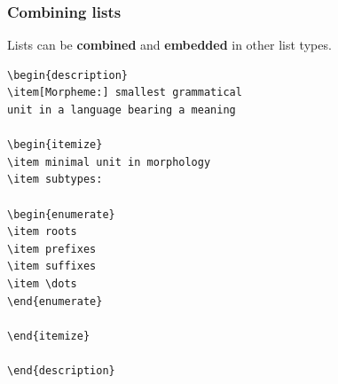 \begin{frame}[fragile]
\frametitle{Combining lists}

Lists can be \textbf{combined} and \textbf{embedded} in other list types. 

\begin{multicols}{2}
\begin{lstlisting}
\begin{description}
\item[Morpheme:] smallest grammatical 
unit in a language bearing a meaning

\begin{itemize}
\item minimal unit in morphology
\item subtypes:

\begin{enumerate}
\item roots
\item prefixes
\item suffixes
\item \dots
\end{enumerate}

\end{itemize}

\end{description}
\end{lstlisting}
\columnbreak{}
\end{multicols}
\end{frame}


